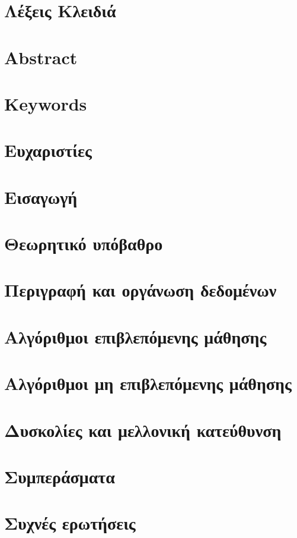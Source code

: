 \documentclass[11pt, twoside]{report}
\begin{document}
\chapter*{Λέξεις Κλειδιά}
\chapter*{Abstract}
\chapter*{Keywords} 
\chapter*{Ευχαριστίες}
\tableofcontents{} %
\listoffigures{}	%
\listoftables{} %

\chapter{Εισαγωγή}

\citep{einstein}
\chapter{Θεωρητικό υπόβαθρο}


\chapter{Περιγραφή και οργάνωση δεδομένων}


\chapter{Αλγόριθμοι επιβλεπόμενης μάθησης}


\chapter{Αλγόριθμοι μη επιβλεπόμενης μάθησης}


\chapter{Δυσκολίες και μελλονική κατεύθυνση}


\chapter{Συμπεράσματα}


\appendix
\chapter{Συχνές ερωτήσεις}
%
\printbibliography
\end{document}
